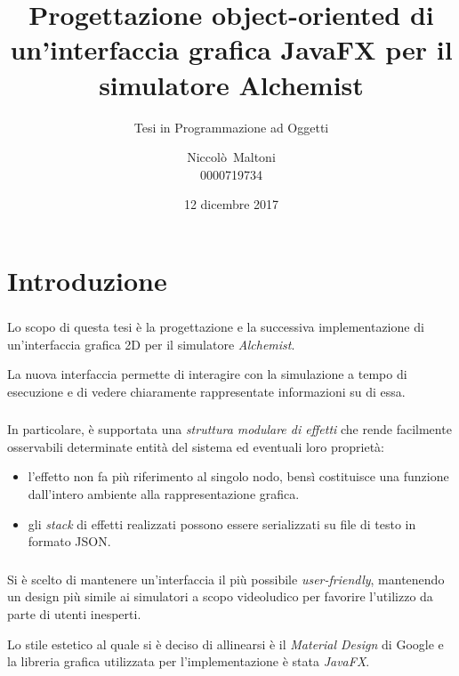 \documentclass[%
]{beamer}
\title[Nuova GUI Alchemist in JavaFX]{%
    Progettazione object-oriented di un'interfaccia grafica %
    JavaFX per il simulatore Alchemist
}
\subtitle{Tesi in Programmazione ad Oggetti}
\author[Niccolò~Maltoni]{Niccolò~Maltoni\\0000719734}
\date{12 dicembre 2017}
\institute[]{%
    Alma Mater Studiorum - Università di Bologna\\%
    Campus di Cesena%
}
\newcommand{\engEmph}[1] {\emph{\foreignlanguage{english}#1}}
\begin{document}
    \begin{frame}
        \titlepage
    \end{frame}

    \section{Introduzione}\label{sec:intro}
    \begin{frame}
        \frametitle{\insertsection}

        Lo scopo di questa tesi è la progettazione e la successiva implementazione di un'interfaccia grafica 2D per il simulatore \emph{Alchemist}.

        \medskip %
        \pause

        La nuova interfaccia permette di interagire con la simulazione a tempo di esecuzione e di vedere chiaramente rappresentate informazioni su di essa.
    \end{frame}

    \begin{frame}
        \frametitle{\insertsection}

        In particolare, è supportata una \emph{struttura modulare di effetti} che rende facilmente osservabili determinate entità del sistema ed eventuali loro proprietà:

        \begin{itemize}[<+(1)->]
            \item
                l'effetto non fa più riferimento al singolo nodo, bensì costituisce una funzione dall'intero ambiente alla rappresentazione grafica.
            \item
                gli \engEmph{stack} di effetti realizzati possono essere serializzati su file di testo in formato JSON.
        \end{itemize}
    \end{frame}

    \begin{frame}
        \frametitle{\insertsection}

        Si è scelto di mantenere un'interfaccia il più possibile \engEmph{user-friendly}, mantenendo un design più simile ai simulatori a scopo videoludico per favorire l'utilizzo da parte di utenti inesperti.

        \medskip
        \pause

        Lo stile estetico al quale si è deciso di allinearsi è il \emph{Material Design} di Google e la libreria grafica utilizzata per l'implementazione è stata \emph{JavaFX}.
    \end{frame}
\end{document}

